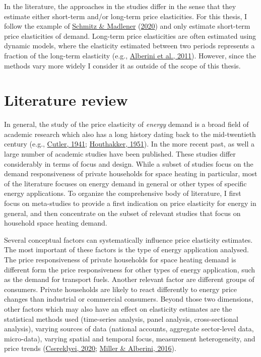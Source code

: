 \documentclass[12pt,twoside]{reedthesis}
\begin{document}
In the literature, the approaches in the studies differ in the sense that they estimate either short-term and/or long-term price elasticities. For this thesis, I follow the example of \protect\hyperlink{ref-schmitz_madlener20}{Schmitz \& Madlener} (\protect\hyperlink{ref-schmitz_madlener20}{2020}) and only estimate short-term price elasticities of demand. Long-term price elasticities are often estimated using dynamic models, where the elasticity estimated between two periods represents a fraction of the long-term elasticity (e.g., \protect\hyperlink{ref-alberini_etal11}{Alberini et al., 2011}). However, since the methods vary more widely I consider it as outside of the scope of this thesis.

\hypertarget{review}{%
\section{Literature review}\label{review}}

In general, the study of the price elasticity of \emph{energy} demand is a broad field of academic research which also has a long history dating back to the mid-twentieth century (e.g., \protect\hyperlink{ref-cutler41}{Cutler, 1941}; \protect\hyperlink{ref-houthakker51}{Houthakker, 1951}). In the more recent past, as well a large number of academic studies have been published. These studies differ considerably in terms of focus and design. While a subset of studies focus on the demand responsiveness of private households for space heating in particular, most of the literature focuses on energy demand in general or other types of specific energy applications. To organize the comprehensive body of literature, I first focus on meta-studies to provide a first indication on price elasticity for energy in general, and then concentrate on the subset of relevant studies that focus on household space heating demand.

Several conceptual factors can systematically influence price elasticity estimates. The most important of these factors is the type of energy application analysed. The price responsiveness of private households for space heating demand is different form the price responsiveness for other types of energy application, such as the demand for transport fuels. Another relevant factor are different groups of consumers. Private households are likely to react differently to energy price changes than industrial or commercial consumers. Beyond those two dimensions, other factors which may also have an effect on elasticity estimates are the statistical methods used (time-series analysis, panel analysis, cross-sectional analysis), varying sources of data (national accounts, aggregate sector-level data, micro-data), varying spatial and temporal focus, measurement heterogeneity, and price trends (\protect\hyperlink{ref-csereklyei20}{Csereklyei, 2020}; \protect\hyperlink{ref-miller_alberini16}{Miller \& Alberini, 2016}).
\end{document}
